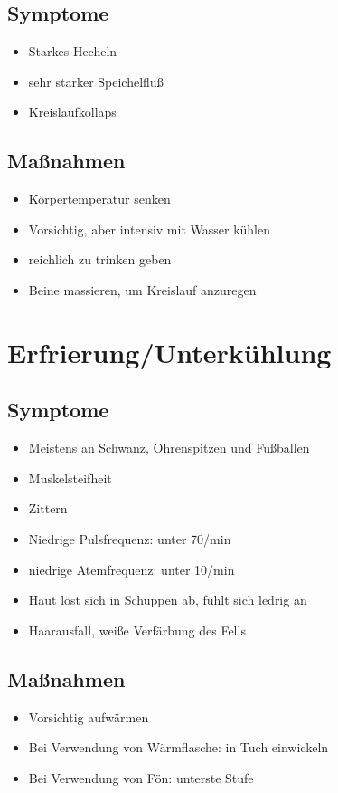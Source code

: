     \subsection{Symptome}
        \begin{itemize}
            \item Starkes Hecheln
            \item sehr starker Speichelfluß
            \item Kreislaufkollaps
        \end{itemize}
    \subsection{Maßnahmen}
        \begin{itemize}
            \item Körpertemperatur senken
            \item Vorsichtig, aber intensiv mit Wasser kühlen
            \item reichlich zu trinken geben
            \item Beine massieren, um Kreislauf anzuregen
        \end{itemize}

\section{Erfrierung/Unterkühlung}
    \subsection{Symptome}
        \begin{itemize}
            \item Meistens an Schwanz, Ohrenspitzen und Fußballen
            \item Muskelsteifheit
            \item Zittern
            \item Niedrige Pulsfrequenz: unter 70/min
            \item niedrige Atemfrequenz: unter 10/min
            \item Haut löst sich in Schuppen ab, fühlt sich ledrig an
            \item Haarausfall, weiße Verfärbung des Fells
        \end{itemize}
    \subsection{Maßnahmen}
        \begin{itemize}
            \item Vorsichtig aufwärmen
            \item Bei Verwendung von Wärmflasche: in Tuch einwickeln
            \item Bei Verwendung von Fön: unterste Stufe
        \end{itemize}


